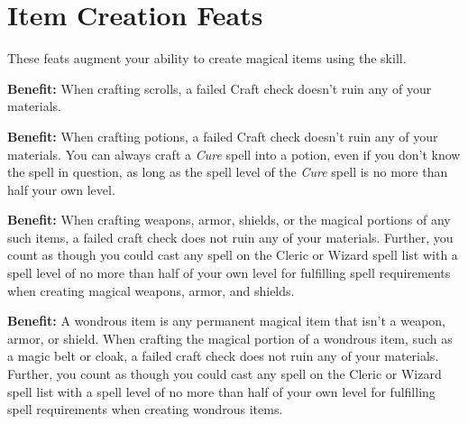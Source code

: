 \section{Item Creation Feats}

These feats augment your ability to create magical items using the  skill.


\textbf{Benefit:} When crafting scrolls, a failed Craft check doesn't ruin any of your materials.


\textbf{Benefit:} When crafting potions, a failed Craft check doesn't ruin any of your materials. You can always craft a \textit{Cure} spell into a potion, even if you don't know the spell in question, as long as the spell level of the \textit{Cure} spell is no more than half your own level.


\textbf{Benefit:} When crafting weapons, armor, shields, or the magical portions of any such items, a failed craft check does not ruin any of your materials. Further, you count as though you could cast any spell on the Cleric or Wizard spell list with a spell level of no more than half of your own level for fulfilling spell requirements when creating magical weapons, armor, and shields.


\textbf{Benefit:} A wondrous item is any permanent magical item that isn't a weapon, armor, or shield. When crafting the magical portion of a wondrous item, such as a magic belt or cloak, a failed craft check does not ruin any of your materials. Further, you count as though you could cast any spell on the Cleric or Wizard spell list with a spell level of no more than half of your own level for fulfilling spell requirements when creating wondrous items.